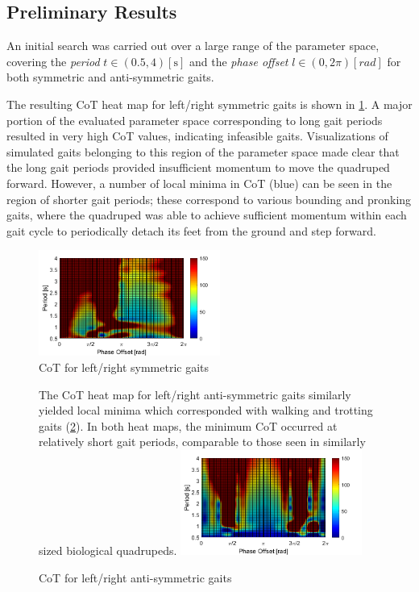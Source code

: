 \documentclass[conference,11pt,letterpaper]{IEEEtran}
\begin{document}
\subsection{Preliminary Results}
An initial search was carried out over a large range of the parameter space, covering the \emph{period} $t \in (0.5,4) [\si{\s}]$ and the \emph{phase offset} $l \in (0,2\pi) [\si{rad}]$ for both symmetric and anti-symmetric gaits.

The resulting CoT heat map for left/right symmetric gaits is shown in \cref{fig:sync_gait}. A major portion of the evaluated parameter space corresponding to long gait periods resulted in very high CoT values, indicating infeasible gaits. Visualizations of simulated gaits belonging to this region of the parameter space made clear that the long gait periods provided insufficient momentum to move the quadruped forward. However, a number of local minima in CoT (blue) can be seen in the region of shorter gait periods; these correspond to various bounding and pronking gaits, where the quadruped was able to achieve sufficient momentum within each gait cycle to periodically detach its feet from the ground and step forward.
           \begin{figure}[ht!]
   
           \includegraphics[width=0.53\textwidth]{smooth_CoT_sync_gait}
           \caption{CoT for left/right symmetric gaits}
           \label{fig:sync_gait}
           \end{figure}
                      \begin{figure}[ht!]
The CoT heat map for left/right anti-symmetric gaits similarly yielded local minima which corresponded with walking and trotting gaits (\cref{fig:unsync_gait}). In both heat maps, the minimum CoT occurred at relatively short gait periods, comparable to those seen in similarly sized biological quadrupeds.
           \includegraphics[width=0.53\textwidth]{smooth_CoT_unsync_gait}
           \caption{CoT for left/right anti-symmetric gaits}
           \label{fig:unsync_gait}
           \end{figure}
       
\end{document}
